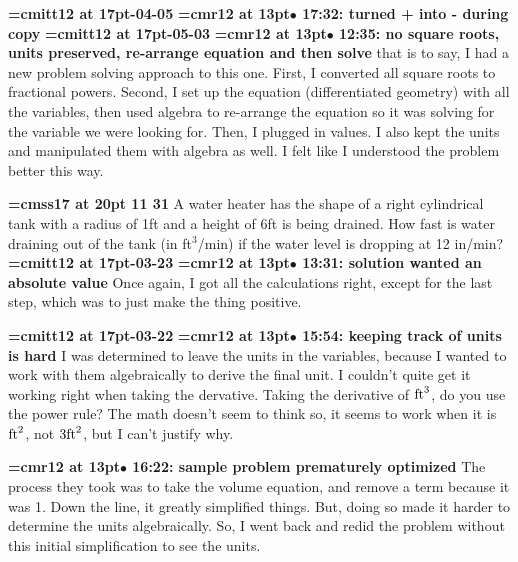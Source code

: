 {\medskip\noindent\bf\font\titlefont=cmitt12 at 17pt-04-05}\medskip
{\smallskip\noindent\bf\font\titlefont=cmr12 at 13pt\titlefont $\bullet$ 17:32: turned + into - during copy}\smallskip
{\medskip\noindent\bf\font\titlefont=cmitt12 at 17pt-05-03}\medskip
{\smallskip\noindent\bf\font\titlefont=cmr12 at 13pt\titlefont $\bullet$ 12:35: no square roots, units preserved, re-arrange equation and then solve}\smallskip
that is to say, I had a new problem solving approach to this one. First, I converted all square roots to fractional powers. Second, I set up the equation (differentiated geometry) with all the variables, then used algebra to re-arrange the equation so it was solving for the variable we were looking for. Then, I plugged in values. I also kept the units and manipulated them with algebra as well. I felt like I understood the problem better this way.
\par

{\medskip\noindent\bf\font\titlefont=cmss17 at 20pt 11 31}\medskip
A water heater has the shape of a right cylindrical tank
with a radius of 1ft and a height of 6ft is being drained.
How fast is water draining out of the tank (in ft$^3$/min) if
the water level is dropping at 12 in/min?
{\medskip\noindent\bf\font\titlefont=cmitt12 at 17pt-03-23}\medskip
{\smallskip\noindent\bf\font\titlefont=cmr12 at 13pt\titlefont $\bullet$ 13:31: solution wanted an absolute value}\smallskip
Once again, I got all the calculations right, except for the last step, which was to just make the thing positive.
\par

{\medskip\noindent\bf\font\titlefont=cmitt12 at 17pt-03-22}\medskip
{\smallskip\noindent\bf\font\titlefont=cmr12 at 13pt\titlefont $\bullet$ 15:54: keeping track of units is hard}\smallskip
I was determined to leave the units in the variables, because I wanted to work with them algebraically to derive the final unit. I couldn't quite get it working right when taking the dervative. Taking the derivative of $\hbox{ft}^3$, do you use the power rule? The math doesn't seem to think so, it seems to work when it is $\hbox{ft}^2$, not $3\hbox{ft}^2$, but I can't justify why.
\par

{\smallskip\noindent\bf\font\titlefont=cmr12 at 13pt\titlefont $\bullet$ 16:22: sample problem prematurely optimized}\smallskip
The process they took was to take the volume equation, and remove a term because it was 1. Down the line, it greatly simplified things. But, doing so made it harder to determine the units algebraically. So, I went back and redid the problem without this initial simplification to see the units.
\par

